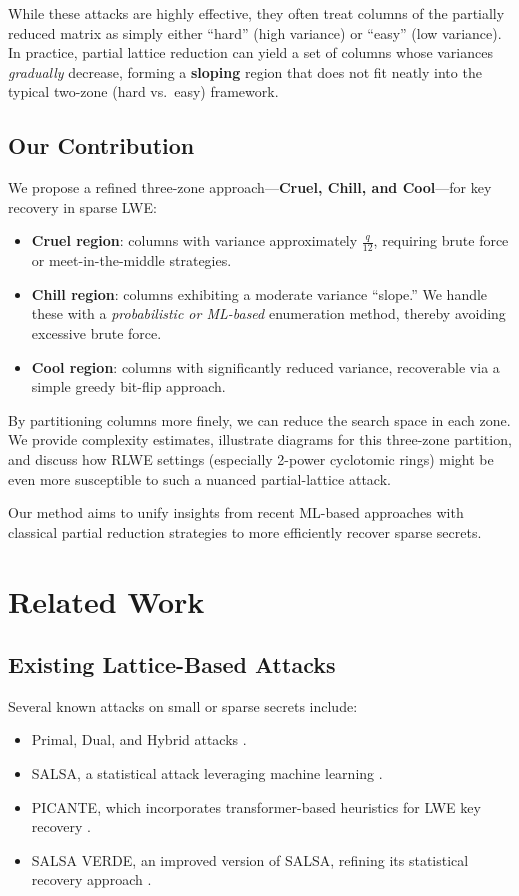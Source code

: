 \documentclass[11pt]{article}
\begin{document}
  While these attacks are highly effective, they often treat columns of the partially reduced matrix as simply either “hard” (high variance) or “easy” (low variance). In practice, partial lattice reduction can yield a set of columns whose variances \emph{gradually} decrease, forming a \textbf{sloping} region that does not fit neatly into the typical two-zone (hard vs.\ easy) framework.
  
  \subsection{Our Contribution}
  
  We propose a refined three-zone approach—\textbf{Cruel, Chill, and Cool}—for key recovery in sparse LWE:
  
  \begin{itemize}
      \item \textbf{Cruel region}: columns with variance approximately $\frac{q}{12}$, requiring brute force or meet-in-the-middle strategies.
      \item \textbf{Chill region}: columns exhibiting a moderate variance “slope.” We handle these with a \emph{probabilistic or ML-based} enumeration method, thereby avoiding excessive brute force.
      \item \textbf{Cool region}: columns with significantly reduced variance, recoverable via a simple greedy bit-flip approach.
  \end{itemize}
  
  By partitioning columns more finely, we can reduce the search space in each zone. We provide complexity estimates, illustrate diagrams for this three-zone partition, and discuss how RLWE settings (especially 2-power cyclotomic rings) might be even more susceptible to such a nuanced partial-lattice attack. 
  
  Our method aims to unify insights from recent ML-based approaches with classical partial reduction strategies to more efficiently recover sparse secrets.
  
  \section{Related Work}
  
  \subsection{Existing Lattice-Based Attacks}
  Several known attacks on small or sparse secrets include:
  \begin{itemize}
      \item Primal, Dual, and Hybrid attacks \cite{primal-dual, hybrid-mitm}.
      \item SALSA, a statistical attack leveraging machine learning \cite{salsa}.
      \item PICANTE, which incorporates transformer-based heuristics for LWE key recovery \cite{picante}.
      \item SALSA VERDE, an improved version of SALSA, refining its statistical recovery approach \cite{salsa-verde}.
  \end{itemize}
  
\end{document}
